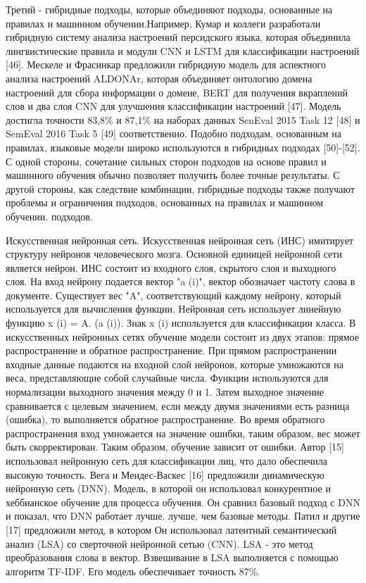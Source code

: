 Третий - гибридные подходы, которые объединяют подходы, основанные на правилах и
машинном обучении.Например, Кумар и коллеги разработали гибридную систему
анализа настроений персидского языка, которая объединила лингвистические правила
и модули CNN и LSTM для классификации настроений [46]. Мескеле и Фрасинкар
предложили гибридную модель для аспектного анализа настроений ALDONAr, которая
объединяет онтологию домена настроений для сбора информации о домене, BERT для
получения вкраплений слов и два слоя CNN для улучшения классификации настроений
[47]. Модель достигла точности 83,8\% и 87,1\% на наборах данных SenEval 2015
Task 12 [48] и SemEval 2016 Task 5 [49] соответственно. Подобно подходам,
основанным на правилах, языковые модели широко используются в гибридных подходах
[50]-[52].  С одной стороны, сочетание сильных сторон подходов на основе правил
и машинного обучения обычно позволяет получить более точные результаты. С другой
стороны, как следствие комбинации, гибридные подходы также получают проблемы и
ограничения подходов, основанных на правилах и машинном обучении.
подходов.\cite{article15}

Искусственная нейронная сеть. Искусственная нейронная сеть (ИНС) имитирует
структуру нейронов человеческого мозга. Основной единицей нейронной сети
является нейрон. ИНС состоит из входного слоя, скрытого слоя и выходного слоя.
На вход нейрону подается вектор "a (i)", вектор обозначает частоту слова в
документе. Существует вес "A", соответствующий каждому нейрону, который
используется для вычисления функции.  Нейронная сеть использует линейную функцию
x (i) = A. (a (i)). Знак x (i) используется для классификации класса.  В
искусственных нейронных сетях обучение модели состоит из двух этапов: прямое
распространение и обратное распространение. При прямом распространении входные
данные подаются на входной слой нейронов, которые умножаются на веса,
представляющие собой случайные числа. Функции используются для нормализации
выходного значения между 0 и 1. Затем выходное значение сравнивается с целевым
значением, если между двумя значениями есть разница (ошибка), то выполняется
обратное распространение. Во время обратного распространения вход умножается на
значение ошибки, таким образом, вес может быть скорректирован. Таким образом,
обучение зависит от ошибки. Автор [15] использовал нейронную сеть для
классификации лиц, что дало обеспечила высокую точность.  Вега и Мендес-Васкес
[16] предложили динамическую нейронную сеть (DNN). Модель, в которой он
использовал конкурентное и хеббианское обучение для процесса обучения.  Он
сравнил базовый подход с DNN и показал, что DNN работает лучше. лучше, чем
базовые методы. Патил и другие [17] предложили метод, в котором Он использовал
латентный семантический анализ (LSA) со сверточной нейронной сетью (CNN).  LSA -
это метод преобразования слова в вектор. Взвешивание в LSA выполняется с помощью
алгоритм TF-IDF. Его модель обеспечивает точность 87\%. \cite{article16}


